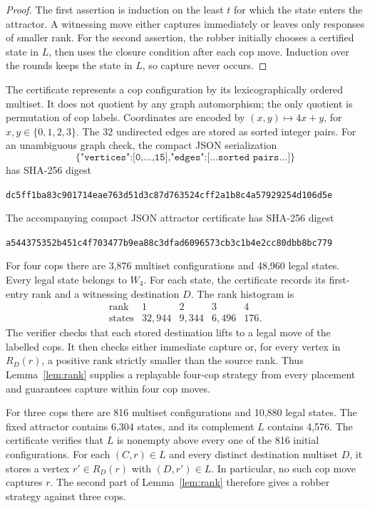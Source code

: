 \documentclass[11pt]{article}
\begin{document}
\begin{proof}
The first assertion is induction on the least $t$ for which the state enters
the attractor.  A witnessing move either captures immediately or leaves only
responses of smaller rank.  For the second assertion, the robber initially
chooses a certified state in $L$, then uses the closure condition after each
cop move.  Induction over the rounds keeps the state in $L$, so capture never
occurs.
\end{proof}

The certificate represents a cop configuration by its lexicographically
ordered multiset.  It does not quotient by any graph automorphism; the only
quotient is permutation of cop labels.  Coordinates are encoded by
$(x,y)\mapsto4x+y$, for $x,y\in\{0,1,2,3\}$.  The 32 undirected edges are
stored as sorted integer pairs.  For an unambiguous graph check, the compact
JSON serialization
\[
\texttt{\{"vertices":[0,...,15],"edges":[...sorted pairs...]\}}
\]
has SHA-256 digest
\begin{center}
\small\nolinkurl{dc5ff1ba83c901714eae763d51d3c87d763524cff2a1b8c4a57929254d106d5e}
\end{center}
The accompanying compact JSON attractor certificate has SHA-256 digest
\begin{center}
\small\nolinkurl{a544375352b451c4f703477b9ea88c3dfad6096573cb3c1b4e2cc80dbb8bc779}
\end{center}

For four cops there are 3,876 multiset configurations and 48,960 legal states.
Every legal state belongs to $W_4$.  For each state, the certificate records
its first-entry rank and a witnessing destination $D$.  The rank histogram is
\[
\begin{array}{c|rrrr}
\text{rank}&1&2&3&4\\ \hline
\text{states}&32{,}944&9{,}344&6{,}496&176.
\end{array}
\]
The verifier checks that each stored destination lifts to a legal move of the
labelled cops.  It then checks either immediate capture or, for every vertex
in $R_D(r)$, a positive rank strictly smaller than the source rank.  Thus
Lemma~\ref{lem:rank} supplies a replayable four-cop strategy from every
placement and guarantees capture within four cop moves.

For three cops there are 816 multiset configurations and 10,880 legal states.
The fixed attractor contains 6,304 states, and its complement $L$ contains
4,576.  The certificate verifies that $L$ is nonempty above every one of the
816 initial configurations.  For each $(C,r)\in L$ and every distinct
destination multiset $D$, it stores a vertex $r'\in R_D(r)$ with
$(D,r')\in L$.  In particular, no such cop move captures $r$.  The second
part of Lemma~\ref{lem:rank} therefore gives a robber strategy against three
cops.
\end{document}
